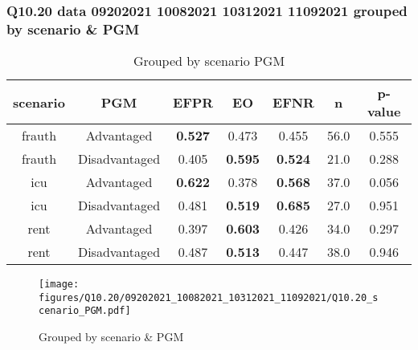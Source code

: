 \subsubsection{Q10.20 data 09202021 10082021 10312021 11092021 grouped by scenario \& PGM}

\begin{comment}
                             EFPR        EO      EFNR     n    pvalue
(frauth, Advantaged)     0.526786  0.473214  0.455357  56.0  0.555439
(frauth, Disadvantaged)  0.404762  0.595238  0.523810  21.0  0.287938
(icu, Advantaged)        0.621622  0.378378  0.567568  37.0  0.056030
(icu, Disadvantaged)     0.481481  0.518519  0.685185  27.0  0.950828
(rent, Advantaged)       0.397059  0.602941  0.426471  34.0  0.297320
(rent, Disadvantaged)    0.486842  0.513158  0.447368  38.0  0.946217
\end{comment}

\begin{table}[h]
    \centering
    \begin{tabular}{|c|c|c|c|c|c|c|}
        \hline
        scenario & PGM & EFPR & EO & EFNR & n & p-value\\
        \hline
        frauth & Advantaged & \textbf{0.527} & 0.473 & 0.455 & 56.0 & 0.555\\
		frauth & Disadvantaged & 0.405 & \textbf{0.595} & \textbf{0.524} & 21.0 & 0.288\\
		icu & Advantaged & \textbf{0.622} & 0.378 & \textbf{0.568} & 37.0 & 0.056\\
		icu & Disadvantaged & 0.481 & \textbf{0.519} & \textbf{0.685} & 27.0 & 0.951\\
		rent & Advantaged & 0.397 & \textbf{0.603} & 0.426 & 34.0 & 0.297\\
		rent & Disadvantaged & 0.487 & \textbf{0.513} & 0.447 & 38.0 & 0.946\\
		
        \hline
    \end{tabular}
    \caption{Grouped by scenario PGM}
    \label{tab:my_label}
\end{table}
\begin{figure}[h]
    \centering
    \texttt{[image: figures/Q10.20/09202021\_10082021\_10312021\_11092021/Q10.20\_scenario\_PGM.pdf]}
    \caption{Grouped by scenario \& PGM}
    \label{fig:my_label}
\end{figure}
